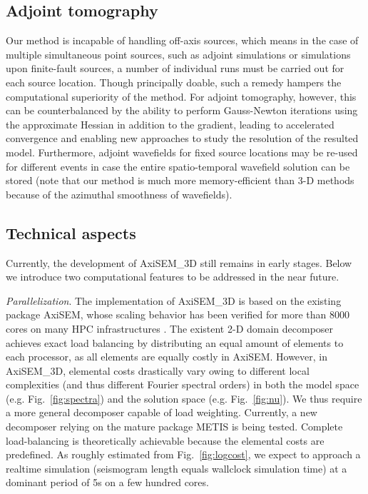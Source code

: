 \documentclass[extra]{gji}
\begin{document}
\subsection{Adjoint tomography}
Our method is incapable of handling off-axis sources, which means
in the case of multiple simultaneous point sources, such as adjoint
simulations \cite[]{tromp2008spectral, liu2008finite} or simulations upon 
finite-fault sources, a number of individual runs must be carried out for 
each source location. 
Though principally doable, such a remedy hampers the computational superiority of the method. 
For adjoint tomography, however, this can be counterbalanced by the 
ability to perform Gauss-Newton iterations using the approximate Hessian 
\cite[Chap 10,][]{nocedal2006numerical} in addition to the gradient, 
leading to accelerated convergence and enabling new approaches to study the 
resolution of the resulted model. Furthermore, 
adjoint wavefields for fixed source locations may be re-used for different events 
in case the entire spatio-temporal wavefield solution can be stored (note that
our method is much more memory-efficient than 3-D methods
because of the azimuthal smoothness of wavefields). 

\subsection{Technical aspects}
Currently, the development of AxiSEM\_3D still remains in early
stages. Below we introduce two computational features to be addressed 
in the near future.

\textit{Parallelization}.
The implementation of AxiSEM\_3D is based on the existing 
package AxiSEM, whose scaling behavior has been verified for more than 
8000 cores on many HPC infrastructures \cite[]{nissen2014axisem}. 
The existent 2-D domain decomposer achieves exact load balancing 
by distributing an equal amount of elements to each
processor, as all elements are equally costly in AxiSEM.
However, in AxiSEM\_3D, elemental costs drastically vary 
owing to different local complexities (and thus different Fourier spectral orders) 
in both the model space 
(e.g. Fig.~\ref{fig:spectra}) and the solution space (e.g. Fig.~\ref{fig:nu}).
We thus require a more general decomposer capable of load weighting.
Currently, a new decomposer relying on the mature package 
METIS \cite[]{lasalle2015efficient} is being tested. 
Complete load-balancing is theoretically achievable because 
the elemental costs are predefined.
As roughly estimated from Fig.~\ref{fig:logcost},
we expect to approach a realtime simulation 
(seismogram length equals wallclock simulation time)
at a dominant period of 5s on a few hundred cores.
\end{document}
